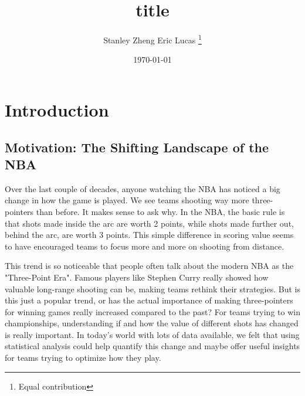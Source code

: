 \documentclass[11pt, a4paper]{article} %
\title{title} %
\author{
Stanley Zheng \space Eric \space Lucas
    \thanks{Equal contribution} %
  }
\date{\small \today} %
\begin{document}
%

\maketitle %


\setcounter{page}{1} %

\section{Introduction} %

\subsection{Motivation: The Shifting Landscape of the NBA} %
Over the last couple of decades, anyone watching the NBA has noticed a big change in how the game is played. We see teams shooting 
way more three-pointers than before. It makes sense to ask why. In the NBA, the basic rule is that shots made inside the arc are 
worth 2 points, while shots made further out, behind the arc, are worth 3 points. This simple difference in scoring value seems to 
have encouraged teams to focus more and more on shooting from distance.

This trend is so noticeable that people often talk about the modern NBA as the "Three-Point Era". Famous players like Stephen Curry 
really showed how valuable long-range shooting can be, making teams rethink their strategies. But is this just a popular trend, or 
has the actual importance of making three-pointers for winning games really increased compared to the past? For teams trying to win 
championships, understanding if and how the value of different shots has changed is really important. In today's world with lots of 
data available, we felt that using statistical analysis could help quantify this change and maybe offer useful insights for teams 
trying to optimize how they play.
\end{document}
